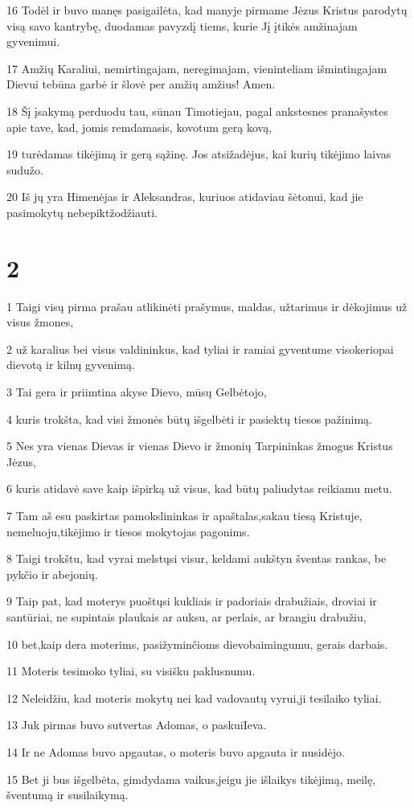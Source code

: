 \par 16 Todėl ir buvo manęs pasigailėta, kad manyje pirmame Jėzus Kristus parodytų visą savo kantrybę, duodamas pavyzdį tiems, kurie Jį įtikės amžinajam gyvenimui. 
\par 17 Amžių Karaliui, nemirtingajam, neregimajam, vieninteliam išmintingajam Dievui tebūna garbė ir šlovė per amžių amžius! Amen. 
\par 18 Šį įsakymą perduodu tau, sūnau Timotiejau, pagal ankstesnes pranašystes apie tave, kad, jomis remdamasis, kovotum gerą kovą, 
\par 19 turėdamas tikėjimą ir gerą sąžinę. Jos atsižadėjus, kai kurių tikėjimo laivas sudužo. 
\par 20 Iš jų yra Himenėjas ir Aleksandras, kuriuos atidaviau šėtonui, kad jie pasimokytų nebepiktžodžiauti.


\chapter{2}


\par 1 Taigi visų pirma prašau atlikinėti prašymus, maldas, užtarimus ir dėkojimus už visus žmones, 
\par 2 už karalius bei visus valdininkus, kad tyliai ir ramiai gyventume visokeriopai dievotą ir kilnų gyvenimą. 
\par 3 Tai gera ir priimtina akyse Dievo, mūsų Gelbėtojo, 
\par 4 kuris trokšta, kad visi žmonės būtų išgelbėti ir pasiektų tiesos pažinimą. 
\par 5 Nes yra vienas Dievas ir vienas Dievo ir žmonių Tarpininkas­ žmogus Kristus Jėzus, 
\par 6 kuris atidavė save kaip išpirką už visus, kad būtų paliudytas reikiamu metu. 
\par 7 Tam aš esu paskirtas pamokslininkas ir apaštalas,­sakau tiesą Kristuje, nemeluoju,­tikėjimo ir tiesos mokytojas pagonims. 
\par 8 Taigi trokštu, kad vyrai melstųsi visur, keldami aukštyn šventas rankas, be pykčio ir abejonių. 
\par 9 Taip pat, kad moterys puoštųsi kukliais ir padoriais drabužiais, droviai ir santūriai, ne supintais plaukais ar auksu, ar perlais, ar brangiu drabužiu, 
\par 10 bet,­kaip dera moterims, pasižyminčioms dievobaimingumu,­ gerais darbais. 
\par 11 Moteris tesimoko tyliai, su visišku paklusnumu. 
\par 12 Neleidžiu, kad moteris mokytų nei kad vadovautų vyrui,­ji tesilaiko tyliai. 
\par 13 Juk pirmas buvo sutvertas Adomas, o paskui­Ieva. 
\par 14 Ir ne Adomas buvo apgautas, o moteris buvo apgauta ir nusidėjo. 
\par 15 Bet ji bus išgelbėta, gimdydama vaikus,­jeigu jie išlaikys tikėjimą, meilę, šventumą ir susilaikymą.


